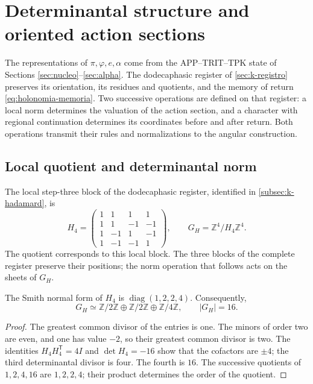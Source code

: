 \section{Determinantal structure and oriented action sections}
\label{iv:action:section}

The representations of \(\pi,\varphi,e,\alpha\) come from the
APP--TRIT--TPK state of Sections
\ref{sec:nucleo}--\ref{sec:alpha}. The dodecaphasic register of
\ref{sec:k-registro} preserves its orientation, its residues and
quotients, and the memory of return
\eqref{eq:holonomia-memoria}. Two successive operations are defined on that
register: a local norm determines the valuation of the action
section, and a character with regional continuation determines its
coordinates before and after return. Both operations
transmit their rules and normalizations to the angular construction.

\subsection{Local quotient and determinantal norm}
\label{iv:action:determinantal}

The local step-three block of the dodecaphasic register, identified
in \ref{subsec:k-hadamard}, is
\begin{equation}
 H_4=\begin{pmatrix}
 1&1&1&1\\
 1&1&-1&-1\\
 1&-1&1&-1\\
 1&-1&-1&1
 \end{pmatrix},
 \qquad G_H=\mathbb Z^4/H_4\mathbb Z^4.
 \label{iv:action:h4}
\end{equation}
The quotient corresponds to this local block. The three blocks of the
complete register preserve their positions; the norm operation
that follows acts on the sheets of \(G_H\).

\begin{lemma}
\label{iv:action:smith}
The Smith normal form of \(H_4\) is
\(\operatorname{diag}(1,2,2,4)\). Consequently,
\[
 G_H\simeq\mathbb Z/2\mathbb Z\oplus\mathbb Z/2\mathbb Z
       \oplus\mathbb Z/4\mathbb Z,\qquad |G_H|=16.
\]
\end{lemma}
\begin{proof}
The greatest common divisor of the entries is one. The minors of
order two are even, and one has value \(-2\), so their greatest
common divisor is two. The identities
\(H_4H_4^{\mathsf T}=4I\) and \(\det H_4=-16\) show that the
cofactors are \(\pm4\); the third determinantal divisor is
four. The fourth is \(16\). The successive quotients of
\(1,2,4,16\) are \(1,2,2,4\); their product determines the order
of the quotient.
\end{proof}

